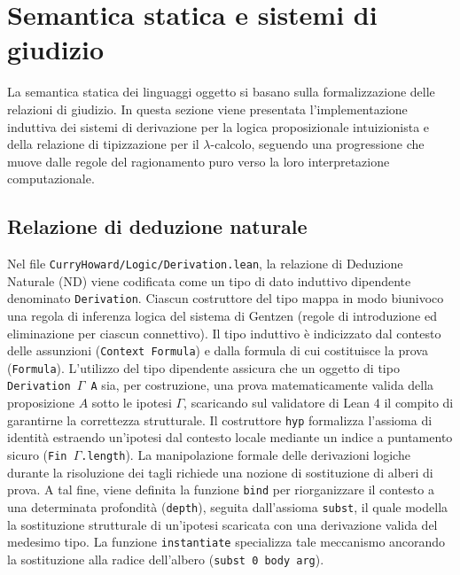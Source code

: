 \section{Semantica statica e sistemi di giudizio}
La semantica statica dei linguaggi oggetto si basano sulla formalizzazione delle relazioni di giudizio. In questa sezione viene presentata l'implementazione induttiva 
dei sistemi di derivazione per la logica proposizionale intuizionista e della relazione di tipizzazione per il $\lambda$-calcolo, seguendo una progressione che muove 
dalle regole del ragionamento puro verso la loro interpretazione computazionale.

\subsection{Relazione di deduzione naturale}
Nel file \texttt{CurryHoward/Logic/Derivation.lean}, la relazione di Deduzione Naturale (ND) viene codificata come un tipo di dato induttivo dipendente denominato \texttt{Derivation}. 
Ciascun costruttore del tipo mappa in modo biunivoco una regola di inferenza logica del sistema di Gentzen (regole di introduzione ed eliminazione per ciascun connettivo). Il tipo induttivo 
è indicizzato dal contesto delle assunzioni (\texttt{Context Formula}) e dalla formula di cui costituisce la prova (\texttt{Formula}). L'utilizzo del tipo dipendente assicura che un oggetto 
di tipo \texttt{Derivation \(\Gamma\) A} sia, per costruzione, una prova matematicamente valida della proposizione \(A\) sotto le ipotesi \(\Gamma\), scaricando sul validatore di Lean 4 il 
compito di garantirne la correttezza strutturale. Il costruttore \texttt{hyp} formalizza l'assioma di identità estraendo un'ipotesi dal contesto locale mediante un indice a puntamento sicuro 
(\texttt{Fin \(\Gamma\).length}). La manipolazione formale delle derivazioni logiche durante la risoluzione dei tagli richiede una nozione di sostituzione di alberi di prova. A tal fine, viene 
definita la funzione \texttt{bind} per riorganizzare il contesto a una determinata profondità (\texttt{depth}), seguita dall'assioma \texttt{subst}, il quale modella la sostituzione strutturale 
di un'ipotesi scaricata con una derivazione valida del medesimo tipo. La funzione \texttt{instantiate} specializza tale meccanismo ancorando la sostituzione alla radice dell'albero (\texttt{subst 0 body arg}).

